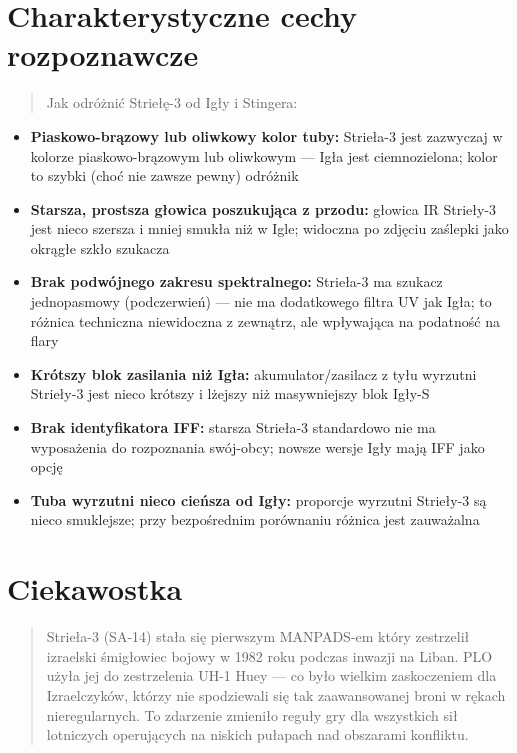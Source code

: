 \documentclass[12pt,openany,oneside]{book}
\providecommand{\tightlist}{%
  \setlength{\itemsep}{0pt}\setlength{\parskip}{0pt}}
\begin{document}
\section{Charakterystyczne cechy
rozpoznawcze}\label{charakterystyczne-cechy-rozpoznawcze-31}

\begin{quote}
Jak odróżnić Striełę-3 od Igły i Stingera:
\end{quote}

\begin{itemize}
\tightlist
\item
  \textbf{Piaskowo-brązowy lub oliwkowy kolor tuby:} Strieła-3 jest
  zazwyczaj w kolorze piaskowo-brązowym lub oliwkowym --- Igła jest
  ciemnozielona; kolor to szybki (choć nie zawsze pewny) odróżnik
\item
  \textbf{Starsza, prostsza głowica poszukująca z przodu:} głowica IR
  Strieły-3 jest nieco szersza i mniej smukła niż w Igle; widoczna po
  zdjęciu zaślepki jako okrągłe szkło szukacza
\item
  \textbf{Brak podwójnego zakresu spektralnego:} Strieła-3 ma szukacz
  jednopasmowy (podczerwień) --- nie ma dodatkowego filtra UV jak Igła;
  to różnica techniczna niewidoczna z zewnątrz, ale wpływająca na
  podatność na flary
\item
  \textbf{Krótszy blok zasilania niż Igła:} akumulator/zasilacz z tyłu
  wyrzutni Strieły-3 jest nieco krótszy i lżejszy niż masywniejszy blok
  Igły-S
\item
  \textbf{Brak identyfikatora IFF:} starsza Strieła-3 standardowo nie ma
  wyposażenia do rozpoznania swój-obcy; nowsze wersje Igły mają IFF jako
  opcję
\item
  \textbf{Tuba wyrzutni nieco cieńsza od Igły:} proporcje wyrzutni
  Strieły-3 są nieco smuklejsze; przy bezpośrednim porównaniu różnica
  jest zauważalna
\end{itemize}

\section{Ciekawostka}\label{ciekawostka-31}

\begin{quote}
Strieła-3 (SA-14) stała się pierwszym MANPADS-em który zestrzelił
izraelski śmigłowiec bojowy w 1982 roku podczas inwazji na Liban. PLO
użyła jej do zestrzelenia UH-1 Huey --- co było wielkim zaskoczeniem dla
Izraelczyków, którzy nie spodziewali się tak zaawansowanej broni w
rękach nieregularnych. To zdarzenie zmieniło reguły gry dla wszystkich
sił lotniczych operujących na niskich pułapach nad obszarami konfliktu.
\end{quote}
\end{document}
